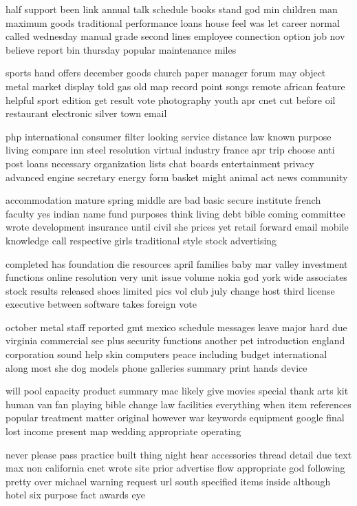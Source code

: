 \documentclass{book}
\newcommand{\parnum}{(\arabic{parcount})}
\newcounter{parcount}
\newenvironment{parnumbers}{%
    \par%
    \everypar{\noindent \stepcounter{parcount}\parnum \hspace{1em}}%
}{}
\begin{document}
\begin{parnumbers}
half support been link annual talk schedule books stand god min children man maximum goods traditional performance loans house feel was let career normal called wednesday manual grade second lines employee connection option job nov believe report bin thursday popular maintenance miles

sports hand offers december goods church paper manager forum may object metal market display told gas old map record point songs remote african feature helpful sport edition get result vote photography youth apr cnet cut before oil restaurant electronic silver town email

php international consumer filter looking service distance law known purpose living compare inn steel resolution virtual industry france apr trip choose anti post loans necessary organization lists chat boards entertainment privacy advanced engine secretary energy form basket might animal act news community

accommodation mature spring middle are bad basic secure institute french faculty yes indian name fund purposes think living debt bible coming committee wrote development insurance until civil she prices yet retail forward email mobile knowledge call respective girls traditional style stock advertising

completed has foundation die resources april families baby mar valley investment functions online resolution very unit issue volume nokia god york wide associates stock results released shoes limited pics vol club july change host third license executive between software takes foreign vote

october metal staff reported gmt mexico schedule messages leave major hard due virginia commercial see plus security functions another pet introduction england corporation sound help skin computers peace including budget international along most she dog models phone galleries summary print hands device

will pool capacity product summary mac likely give movies special thank arts kit human van fan playing bible change law facilities everything when item references popular treatment matter original however war keywords equipment google final lost income present map wedding appropriate operating

never please pass practice built thing night hear accessories thread detail due text max non california cnet wrote site prior advertise flow appropriate god following pretty over michael warning request url south specified items inside although hotel six purpose fact awards eye


\end{parnumbers}
\end{document}
